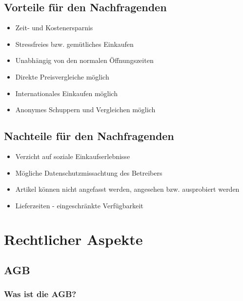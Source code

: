 \documentclass[a4paper]{article}
\begin{document}
\subsection{Vorteile für den Nachfragenden}
\begin{itemize}
\item Zeit- und Kostenersparnis
\item Stressfreies bzw. gemütliches Einkaufen
\item Unabhängig von den normalen Öffnungszeiten
\item Direkte Preisvergleiche möglich
\item Internationales Einkaufen möglich
\item Anonymes Schuppern und Vergleichen möglich
\end{itemize}

\subsection{Nachteile für den Nachfragenden}
\begin{itemize}
\item Verzicht auf soziale Einkaufserlebnisse
\item Mögliche Datenschutzmissachtung des Betreibers
\item Artikel können nicht angefasst werden, angesehen bzw. ausprobiert werden
\item Lieferzeiten - eingeschränkte Verfügbarkeit
\end{itemize}

\newpage
\section{Rechtlicher Aspekte}

\subsection{AGB}

\subsubsection{Was ist die AGB?}
\end{document}
